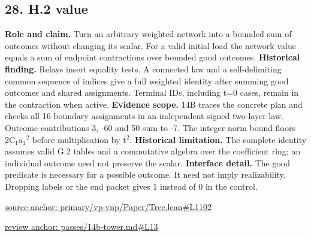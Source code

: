 \documentclass[11pt,letterpaper]{article}
\theoremstyle{definition}\newtheorem{definition}[theorem]{Definition}\newtheorem{example}[theorem]{Example}
\theoremstyle{remark}\newtheorem{remark}[theorem]{Remark}
\begin{document}
\subsection*{28. H.2 value}
\textbf{Role and claim.} Turn an arbitrary weighted network into a bounded sum of outcomes without changing its scalar. For a valid initial load the network value equals a sum of endpoint contractions over bounded good outcomes.
\textbf{Historical finding.} Relays insert equality tests. A connected law and a self-delimiting common sequence of indices give a full weighted identity after summing good outcomes and shared assignments. Terminal IDs, including t=0 cases, remain in the contraction when active.
\textbf{Evidence scope.} 14B traces the concrete plan and checks all 16 boundary assignments in an independent signed two-layer law. Outcome contributions 3, -60 and 50 sum to -7. The integer norm bound floors 2C\ensuremath{{}_1}a\ensuremath{{}_1}\ensuremath{{}^2} before multiplication by t\ensuremath{{}^2}.
\textbf{Historical limitation.} The complete identity assumes valid G.2 tables and a commutative algebra over the coefficient ring; an individual outcome need not preserve the scalar.
\textbf{Interface detail.} The good predicate is necessary for a possible outcome. It need not imply realizability. Dropping labels or the end packet gives 1 instead of 0 in the control.
\par\href{https://github.com/nousentllc/VP-VNP-Review/blob/8a7976933b6b2b4ffda1ad3a0dfb5fc6b6f023e8/primary/vp-vnp/Paper/Tree.lean\#L1102}{source anchor: primary/vp-vnp/Paper/Tree.lean\#L1102}
\par\href{https://github.com/nousentllc/VP-VNP-Review/blob/8a7976933b6b2b4ffda1ad3a0dfb5fc6b6f023e8/passes/14b-tower.md\#L13}{review anchor: passes/14b-tower.md\#L13}
\goodbreak
{}
\hypertarget{claim.29}{}
\end{document}
